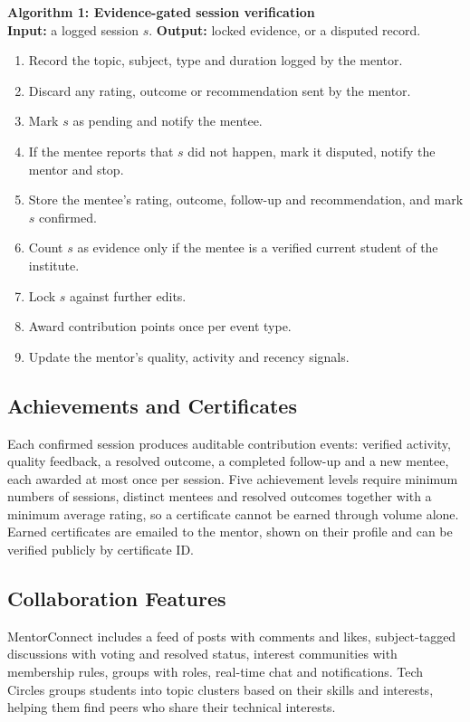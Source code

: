 \documentclass[12pt,a4paper]{report}
\begin{document}
\noindent\textbf{Algorithm 1: Evidence-gated session verification}\\
\textbf{Input:} a logged session $s$. \textbf{Output:} locked evidence, or a disputed record.
\begin{enumerate}
\item Record the topic, subject, type and duration logged by the mentor.
\item Discard any rating, outcome or recommendation sent by the mentor.
\item Mark $s$ as pending and notify the mentee.
\item If the mentee reports that $s$ did not happen, mark it disputed, notify the mentor and stop.
\item Store the mentee's rating, outcome, follow-up and recommendation, and mark $s$ confirmed.
\item Count $s$ as evidence only if the mentee is a verified current student of the institute.
\item Lock $s$ against further edits.
\item Award contribution points once per event type.
\item Update the mentor's quality, activity and recency signals.
\end{enumerate}

\subsection{Achievements and Certificates}
Each confirmed session produces auditable contribution events: verified activity, quality feedback, a resolved outcome, a completed follow-up and a new mentee, each awarded at most once per session. Five achievement levels require minimum numbers of sessions, distinct mentees and resolved outcomes together with a minimum average rating, so a certificate cannot be earned through volume alone. Earned certificates are emailed to the mentor, shown on their profile and can be verified publicly by certificate ID.

\subsection{Collaboration Features}
MentorConnect includes a feed of posts with comments and likes, subject-tagged discussions with voting and resolved status, interest communities with membership rules, groups with roles, real-time chat and notifications. Tech Circles groups students into topic clusters based on their skills and interests, helping them find peers who share their technical interests.
\end{document}
